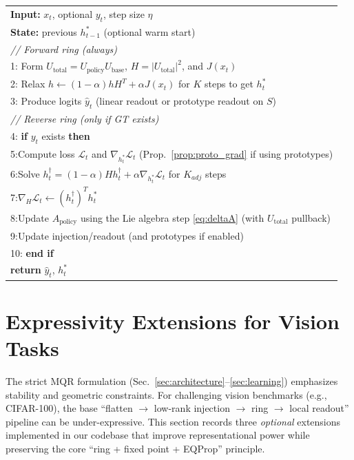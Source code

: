 \documentclass[11pt,a4paper]{article}
\newcommand{\LL}{\mathcal{L}}
\begin{document}
\begin{algorithm}[t]
\caption{Online Dual-Loop MQR (O2EP) at Time $t$}
\label{alg:o2ep}
\begin{tabular}{@{}l@{}}
\textbf{Input:} $x_t$, optional $y_t$, step size $\eta$ \\
\textbf{State:} previous $h_{t-1}^*$ (optional warm start) \\[0.3em]
\textit{// Forward ring (always)} \\
1: Form $U_{\text{total}}=U_{\text{policy}}U_{\text{base}}$, $H=|U_{\text{total}}|^2$, and $J(x_t)$ \\
2: Relax $h\leftarrow (1-\alpha)hH^T+\alpha J(x_t)$ for $K$ steps to get $h_t^*$ \\
3: Produce logits $\hat{y}_t$ (linear readout or prototype readout on $S$) \\[0.3em]
\textit{// Reverse ring (only if GT exists)} \\
4: \textbf{if} $y_t$ exists \textbf{then} \\
5:\quad Compute loss $\LL_t$ and $\nabla_{h_t^*}\LL_t$ (Prop.~\ref{prop:proto_grad} if using prototypes) \\
6:\quad Solve $h_t^\dagger=(1-\alpha)Hh_t^\dagger+\alpha\nabla_{h_t^*}\LL_t$ for $K_{adj}$ steps \\
7:\quad $\nabla_H\LL_t \gets (h_t^\dagger)^T h_t^*$ \\
8:\quad Update $A_{\text{policy}}$ using the Lie algebra step \eqref{eq:deltaA} (with $U_{\text{total}}$ pullback) \\
9:\quad Update injection/readout (and prototypes if enabled) \\
10: \textbf{end if} \\
\textbf{return} $\hat{y}_t$, $h_t^*$ \\
\end{tabular}
\end{algorithm}

\section{Expressivity Extensions for Vision Tasks}
\label{sec:extensions}

The strict MQR formulation (Sec.~\ref{sec:architecture}--\ref{sec:learning}) emphasizes stability and geometric constraints. For challenging vision benchmarks (e.g., CIFAR-100), the base ``flatten $\rightarrow$ low-rank injection $\rightarrow$ ring $\rightarrow$ local readout'' pipeline can be under-expressive. This section records three \emph{optional} extensions implemented in our codebase that improve representational power while preserving the core ``ring + fixed point + EQProp'' principle.
\end{document}
